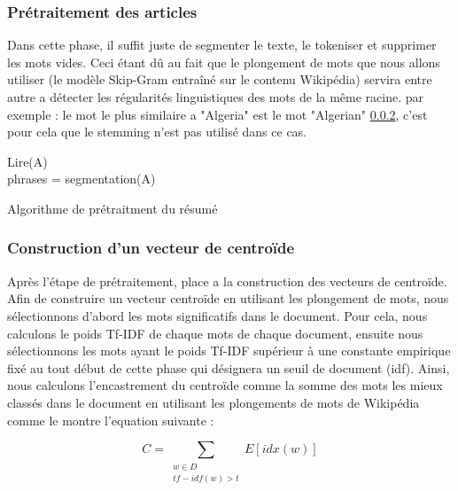         \subsubsection{Prétraitement des articles}
        Dans cette phase, il suffit juste de segmenter le texte, le tokeniser et supprimer les mots vides. Ceci étant dû au fait que le plongement de mots que nous allons utiliser (le modèle Skip-Gram entraîné sur le contenu Wikipédia) servira entre autre a détecter les régularités linguistiques des  mots de la même racine. par exemple : le mot le plus similaire a "Algeria" est le mot "Algerian" \ref{}, c'est pour cela que le stemming n'est pas utilisé dans ce cas.

         \begin{algorithm2e}[H]
           \SetAlgoLined
          Lire(A)\\
          phrases = segmentation(A)\\
         \caption{Algorithme de prétraitment du résumé}
        \end{algorithm2e}

       \subsubsection{Construction d'un vecteur de centroïde}
        Après l'étape de prétraitement, place a la construction des vecteurs de centroïde. Afin de construire un vecteur centroïde en utilisant les plongement de mots, nous sélectionnons d'abord les mots significatifs dans le document. Pour cela, nous calculons le poids Tf-IDF de chaque mots de chaque document, ensuite nous sélectionnons les mots ayant le poids Tf-IDF supérieur à une constante empirique fixé au tout début de cette phase qui désignera un seuil de document (idf). Ainsi, nous calculons l'encastrement du centroïde comme la somme des mots les mieux classés dans le document en utilisant les plongements de mots de Wikipédia comme le montre l'equation suivante :

             \begin{equation*}
             C = \sum_{\substack{w\in D\\
                             tf-idf(w)>t }}
                    E[idx(w)]
             \end{equation*}
             

